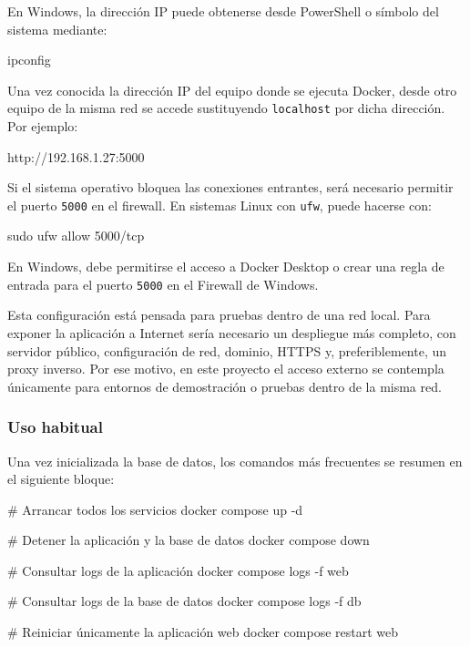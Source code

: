 En Windows, la dirección IP puede obtenerse desde PowerShell o símbolo del sistema mediante:

\begin{bloqueTerminal}[title={Consulta de IP en Windows}]
	ipconfig
\end{bloqueTerminal}

Una vez conocida la dirección IP del equipo donde se ejecuta Docker, desde otro equipo de la misma red se accede sustituyendo \texttt{localhost} por dicha dirección. Por ejemplo:

\begin{bloqueCodigo}[title={Acceso desde otro equipo de la red local}]
	http://192.168.1.27:5000
\end{bloqueCodigo}

Si el sistema operativo bloquea las conexiones entrantes, será necesario permitir el puerto \texttt{5000} en el firewall. En sistemas Linux con \texttt{ufw}, puede hacerse con:

\begin{bloqueTerminal}[title={Apertura del puerto 5000 en Linux}]
	sudo ufw allow 5000/tcp
\end{bloqueTerminal}

En Windows, debe permitirse el acceso a Docker Desktop o crear una regla de entrada para el puerto \texttt{5000} en el Firewall de Windows.

Esta configuración está pensada para pruebas dentro de una red local. Para exponer la aplicación a Internet sería necesario un despliegue más completo, con servidor público, configuración de red, dominio, HTTPS y, preferiblemente, un proxy inverso. Por ese motivo, en este proyecto el acceso externo se contempla únicamente para entornos de demostración o pruebas dentro de la misma red.



\subsubsection{Uso habitual}

Una vez inicializada la base de datos, los comandos más frecuentes se resumen en el siguiente bloque:

\begin{bloqueTerminal}[title={Comandos habituales de Docker Compose}]
	# Arrancar todos los servicios
	docker compose up -d
	
	# Detener la aplicación y la base de datos
	docker compose down
	
	# Consultar logs de la aplicación
	docker compose logs -f web
	
	# Consultar logs de la base de datos
	docker compose logs -f db
	
	# Reiniciar únicamente la aplicación web
	docker compose restart web
\end{bloqueTerminal}

